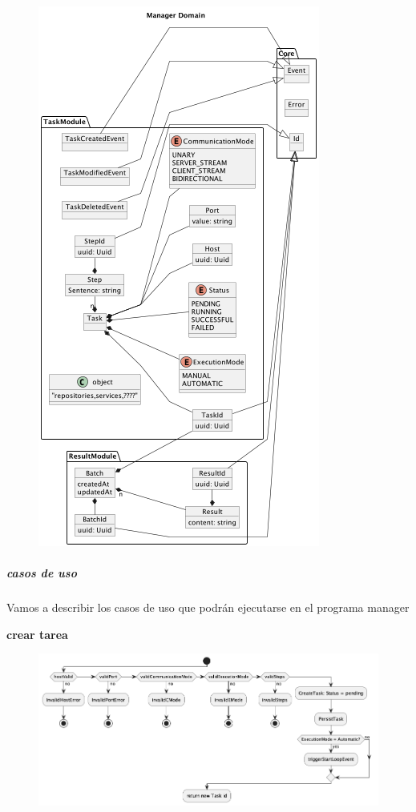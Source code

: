 \begin{figure}[H]
    \centering
    \includegraphics[height=0.4\textheight]{./part/Proyecto_ejecutivo/memoria_descriptiva/descripcionDelProyecto/manager/uml/managerDomain}
    \caption[Diagrama de objetos de dominio]{}\label{fig:managerDomain}
\end{figure}

\subparagraph{casos de uso}

Vamos a describir los casos de uso que podrán ejecutarse en el programa manager

\textbf{crear tarea}

\begin{figure}[H]
    \centering
    \includegraphics[height=0.3\textheight]{./part/Proyecto_ejecutivo/memoria_descriptiva/descripcionDelProyecto/manager/uml/createTaskUseCase}
    \caption[Diagrama de objetos de dominio]{}\label{fig:createTaskUseCase}
\end{figure}

